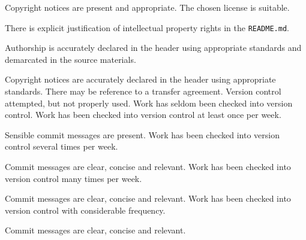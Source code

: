 \documentclass{../../fal_assignment}
\begin{document}
\begin{markingrubric}
            \par Copyright notices are present and appropriate.
        \grade The chosen license is suitable.
            \par There is explicit justification of intellectual property rights in the \texttt{README.md}.
            \par Authorship is accurately declared in the header using appropriate standards and demarcated in the source materials.
            \par Copyright notices are accurately declared in the header using appropriate standards. There may be reference to a transfer agreement.
%
        \grade\fail Version control attempted, but not properly used.
        \grade Work has seldom been checked into version control.
        \grade Work has been checked into version control at least once per week.
            \par Sensible commit messages are present.
        \grade Work has been checked into version control several times per week.
            \par Commit messages are clear, concise and relevant.
        \grade Work has been checked into version control many times per week.
            \par Commit messages are clear, concise and relevant.
        \grade Work has been checked into version control with considerable frequency.
            \par Commit messages are clear, concise and relevant.
%
\end{markingrubric}
\end{document}
